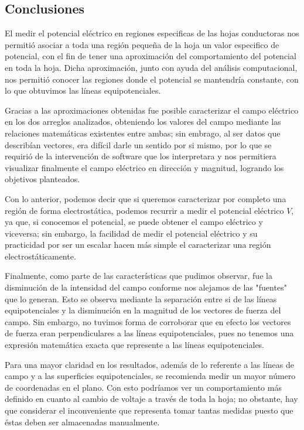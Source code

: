 \documentclass[letterpaper, 11 pt]{article}
\begin{document}
\begin{multicols}{2}
\section{Conclusiones}

El medir el potencial eléctrico en regiones especificas de las hojas conductoras nos permitió asociar a toda una región pequeña de la hoja un valor especifico de potencial, con el fin de tener una aproximación del comportamiento del potencial en toda la hoja. Dicha aproximación, junto con ayuda del análisis computacional, nos permitió conocer las regiones donde el potencial se mantendría constante, con lo que obtuvimos las líneas equipotenciales.

Gracias a las aproximaciones obtenidas fue posible caracterizar el campo eléctrico en los dos arreglos analizados, obteniendo los valores del campo mediante las relaciones matemáticas existentes entre ambas; sin embrago, al ser datos que describían vectores, era difícil darle un sentido por si mismo, por lo que se requirió de la intervención de software que los interpretara y nos permitiera visualizar finalmente el campo eléctrico en dirección y magnitud, logrando los objetivos planteados.

Con lo anterior, podemos decir que si queremos caracterizar por completo una región de forma electrostática, podemos recurrir a medir el potencial eléctrico $V$, ya que, si conocemos el potencial, se puede obtener el campo eléctrico y viceversa; sin embargo, la facilidad de medir el potencial eléctrico y su practicidad por ser un escalar hacen más simple el caracterizar una región electrostáticamente.

Finalmente, como parte de las características que pudimos observar, fue la disminución de la intensidad del campo conforme nos alejamos de las "fuentes" que lo generan. Esto se observa mediante la separación entre si de las líneas equipotenciales y la disminución en la magnitud de los vectores de fuerza del campo. Sin embargo, no tuvimos forma de corroborar que en efecto los vectores de fuerza eran perpendiculares a las líneas equipotenciales, pues no tenemos una expresión matemática exacta que represente a las líneas equipotenciales. 

Para una mayor claridad en los resultados, además de lo referente a las líneas de campo y a las superficies equipotenciales, se recomienda medir un mayor número de coordenadas en el plano. Con esto podríamos ver un comportamiento más definido en cuanto al cambio de voltaje a través de toda la hoja; no obstante, hay que considerar el inconveniente que representa tomar tantas medidas puesto que éstas deben ser almacenadas manualmente. 



\end{multicols}
\end{document}
